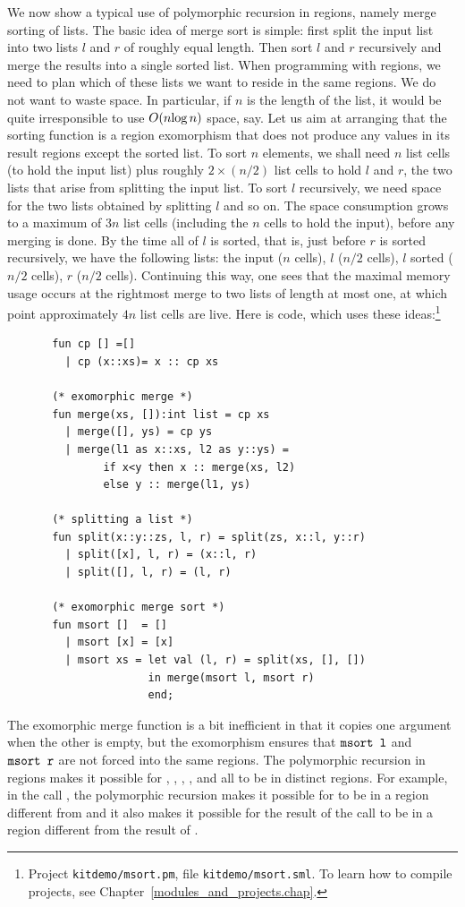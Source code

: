 \documentclass[12pt]{book}
\begin{document}
We now show a typical use of polymorphic recursion in regions, namely
merge sorting of lists. The basic idea of merge sort is simple: first
split the input list into two lists $l$ and $r$ of roughly equal length.
Then sort $l$ and $r$ recursively and merge the results into a single sorted
list.  When programming with regions, we need to plan which of these lists
we want to reside in the same regions. We do not want to waste space. In particular,
if $n$ is the length of the list, it would be quite irresponsible
to use $O(n\hbox{log}\,n)$ space, say.  
Let us aim at arranging that the sorting function is a 
region exomorphism that does not produce any values in its result regions
except the sorted list. To sort $n$ elements, we shall need $n$ list cells 
(to hold the input list) plus roughly $2\times(n/2)$ list cells
to hold $l$ and $r$, the two lists that arise from splitting the input list. To sort $l$ recursively, we need space for the two
lists obtained by splitting $l$ and so on. The space consumption grows to a maximum of $3n$ list cells
(including the $n$ cells to hold the input), before any merging is done.
By the time all of $l$ is sorted, that is, just before $r$ is sorted recursively,
we have the following lists: the input 
($n$ cells), $l$ ($n/2$ cells), $l$ sorted ($n/2$ cells),
$r$ ($n/2$ cells). Continuing this way, one sees that the maximal memory
usage occurs at the rightmost merge to two lists of length at most one, at
which point approximately $4n$ list cells are live. Here is code, which
uses these ideas:\footnote{Project {\tt kitdemo/msort.pm}, file {\tt kitdemo/msort.sml}. To learn how to compile projects, see Chapter~\ref{modules_and_projects.chap}.}
\pagebreak
\begin{verbatim}
       fun cp [] =[]
         | cp (x::xs)= x :: cp xs

       (* exomorphic merge *)
       fun merge(xs, []):int list = cp xs
         | merge([], ys) = cp ys
         | merge(l1 as x::xs, l2 as y::ys) = 
               if x<y then x :: merge(xs, l2) 
               else y :: merge(l1, ys)

       (* splitting a list *)
       fun split(x::y::zs, l, r) = split(zs, x::l, y::r)
         | split([x], l, r) = (x::l, r)
         | split([], l, r) = (l, r)

       (* exomorphic merge sort *)
       fun msort []  = []
         | msort [x] = [x]
         | msort xs = let val (l, r) = split(xs, [], [])
                      in merge(msort l, msort r)
                      end;
\end{verbatim}
The exomorphic merge function is a bit inefficient in that it copies
one argument when the other is empty, but the exomorphism ensures that
$\hbox{\tt msort l}$ and $\hbox{\tt msort r}$ are not forced into the same
regions. The polymorphic recursion in regions makes it possible for
, , , , and 
all to be in distinct regions. For example, in the call , the polymorphic recursion makes it possible for  to be
in a region different from  and it also makes it possible for
the result of the call to be in a region different from the result of
.
\end{document}
